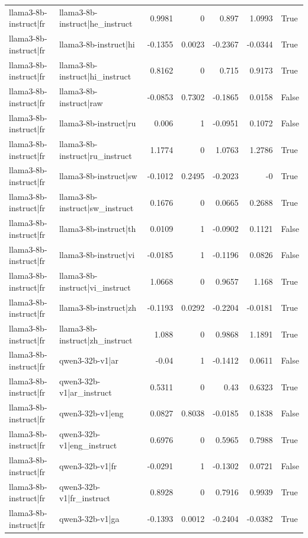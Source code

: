 \begin{table}
\begin{tabular}{l l r r r r l}
llama3-8b-instruct|fr & llama3-8b-instruct|he_instruct & 0.9981 & 0 & 0.897 & 1.0993 & True \\
llama3-8b-instruct|fr & llama3-8b-instruct|hi & -0.1355 & 0.0023 & -0.2367 & -0.0344 & True \\
llama3-8b-instruct|fr & llama3-8b-instruct|hi_instruct & 0.8162 & 0 & 0.715 & 0.9173 & True \\
llama3-8b-instruct|fr & llama3-8b-instruct|raw & -0.0853 & 0.7302 & -0.1865 & 0.0158 & False \\
llama3-8b-instruct|fr & llama3-8b-instruct|ru & 0.006 & 1 & -0.0951 & 0.1072 & False \\
llama3-8b-instruct|fr & llama3-8b-instruct|ru_instruct & 1.1774 & 0 & 1.0763 & 1.2786 & True \\
llama3-8b-instruct|fr & llama3-8b-instruct|sw & -0.1012 & 0.2495 & -0.2023 & -0 & True \\
llama3-8b-instruct|fr & llama3-8b-instruct|sw_instruct & 0.1676 & 0 & 0.0665 & 0.2688 & True \\
llama3-8b-instruct|fr & llama3-8b-instruct|th & 0.0109 & 1 & -0.0902 & 0.1121 & False \\
llama3-8b-instruct|fr & llama3-8b-instruct|vi & -0.0185 & 1 & -0.1196 & 0.0826 & False \\
llama3-8b-instruct|fr & llama3-8b-instruct|vi_instruct & 1.0668 & 0 & 0.9657 & 1.168 & True \\
llama3-8b-instruct|fr & llama3-8b-instruct|zh & -0.1193 & 0.0292 & -0.2204 & -0.0181 & True \\
llama3-8b-instruct|fr & llama3-8b-instruct|zh_instruct & 1.088 & 0 & 0.9868 & 1.1891 & True \\
llama3-8b-instruct|fr & qwen3-32b-v1|ar & -0.04 & 1 & -0.1412 & 0.0611 & False \\
llama3-8b-instruct|fr & qwen3-32b-v1|ar_instruct & 0.5311 & 0 & 0.43 & 0.6323 & True \\
llama3-8b-instruct|fr & qwen3-32b-v1|eng & 0.0827 & 0.8038 & -0.0185 & 0.1838 & False \\
llama3-8b-instruct|fr & qwen3-32b-v1|eng_instruct & 0.6976 & 0 & 0.5965 & 0.7988 & True \\
llama3-8b-instruct|fr & qwen3-32b-v1|fr & -0.0291 & 1 & -0.1302 & 0.0721 & False \\
llama3-8b-instruct|fr & qwen3-32b-v1|fr_instruct & 0.8928 & 0 & 0.7916 & 0.9939 & True \\
llama3-8b-instruct|fr & qwen3-32b-v1|ga & -0.1393 & 0.0012 & -0.2404 & -0.0382 & True \\

\end{tabular}
\end{table}

